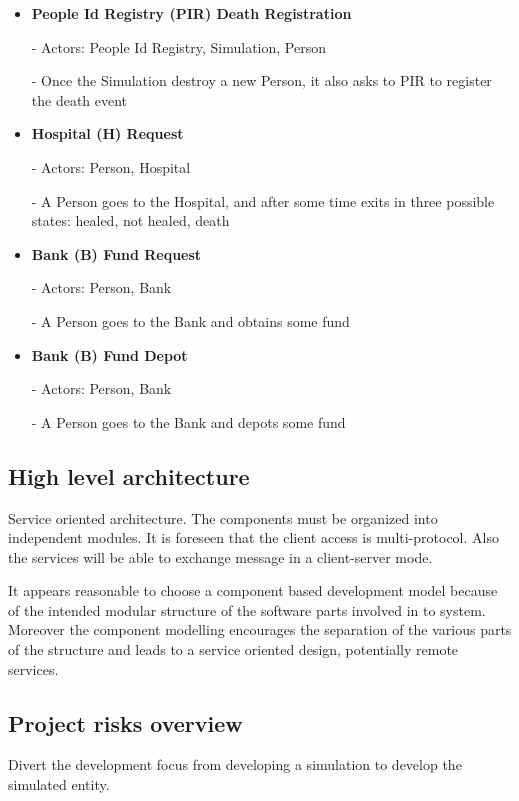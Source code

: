 \begin{itemize}
  \item \textbf{People Id Registry (PIR) Death Registration}

	- Actors: People Id Registry, Simulation, Person

	- Once the Simulation destroy a new Person, it also asks to PIR to
register the death event

  \item \textbf{Hospital (H) Request}

	- Actors: Person, Hospital

	- A Person goes to the Hospital, and after some time exits in three
possible states: healed, not healed, death

  \item \textbf{Bank (B) Fund Request}

	- Actors: Person, Bank

	- A Person goes to the Bank and obtains some fund

  \item \textbf{Bank (B) Fund Depot}

	- Actors: Person, Bank

	- A Person goes to the Bank and depots some fund
\end{itemize}


\subsection{High level architecture}
Service oriented architecture. The components must be organized into independent
modules. It is foreseen that the client access is multi-protocol. Also the
services will be able to exchange message in a client-server mode.

It appears reasonable to choose a component based development model because
of the intended modular structure of the software parts involved in to system.
Moreover the component modelling encourages the separation of the various parts
of the structure and leads to a service oriented design, potentially remote
services.

\subsection{Project risks overview}
Divert the development focus from developing a simulation to develop the
simulated entity.
